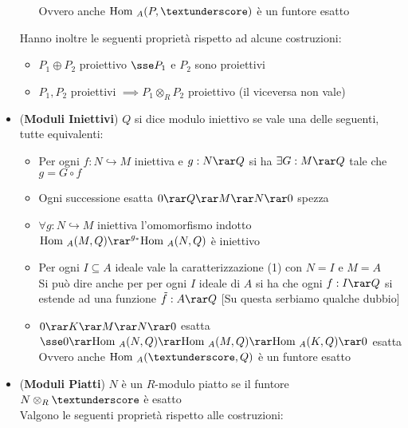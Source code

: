 \documentclass[a4paper,NoNotes,GeneralMath]{stdmdoc}
\newcommand{\hrar}{\hookrightarrow}
\newcommand{\Hom}{\text{Hom }}
\begin{document}
\begin{itemize}
\begin{itemize}
					Ovvero anche $\Hom_A(P, \textunderscore)$ è un funtore esatto
			\end{itemize}
			Hanno inoltre le seguenti proprietà rispetto ad alcune costruzioni:
			\begin{itemize}
				\item $P_1 \oplus P_2$ proiettivo $\sse P_1$ e $P_2$ sono proiettivi
				\item $P_1, P_2$ proiettivi $\implies P_1 \otimes_R P_2$ proiettivo (il viceversa non vale)
			\end{itemize}
		\item ({\bf Moduli Iniettivi}) $Q$ si dice modulo iniettivo se vale una delle seguenti, tutte equivalenti:
			\begin{itemize}
				\item Per ogni $f: N \hrar M$ iniettiva e $g: N \rar Q$ si ha $\exists G: M \rar Q$ tale che $g = G \circ f$
				\item Ogni successione esatta $0 \rar Q \rar M \rar N \rar 0$ spezza
				\item $\forall g: N \hrar M$ iniettiva l'omomorfismo indotto $\Hom_A(M, Q) \rar^{g_*} \Hom_A(N, Q)$ è iniettivo
				\item Per ogni $I \subseteq A$ ideale vale la caratterizzazione (1) con $N = I$ e $M = A$ \\
					Si può dire anche per per ogni $I$ ideale di $A$ si ha che ogni $f: I \rar Q$ si estende ad una funzione $\tilde{f}: A \rar Q$ [Su questa serbiamo qualche dubbio]
				\item $0 \rar K \rar M \rar N \rar 0$ esatta $\sse 0 \rar \Hom_A(N, Q) \rar \Hom_A(M, Q) \rar \Hom_A(K, Q) \rar 0$ esatta \\
					Ovvero anche $\Hom_A(\textunderscore, Q)$ è un funtore esatto
			\end{itemize}
		\item ({\bf Moduli Piatti}) $N$ è un $R$-modulo piatto se il funtore $N \otimes_R \textunderscore$ è esatto \\
			Valgono le seguenti proprietà rispetto alle costruzioni:
			\begin{itemize}

\end{itemize}
\end{itemize}
\end{document}
